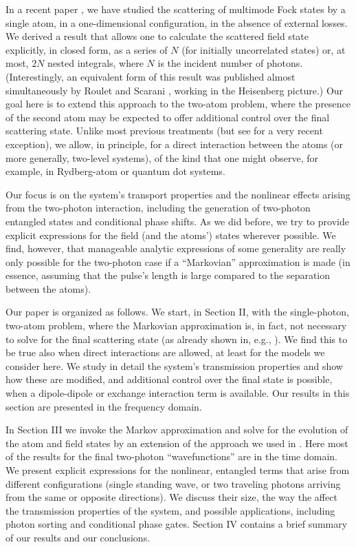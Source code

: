 \documentclass[aps,pra,twocolumn,floatfix,superscriptaddress]{revtex4}
\begin{document}
In a recent paper \cite{us}, we have studied the scattering of multimode Fock states by a single atom, in a one-dimensional configuration, in the absence of external losses. We derived a result that allows one to calculate the scattered field state explicitly, in closed form, as a series of $N$ (for initially uncorrelated states) or, at most, $2N$ nested integrals, where $N$ is the incident number of photons.  (Interestingly, an equivalent form of this result was published almost simultaneously by Roulet and Scarani \cite{roulet}, working in the Heisenberg picture.)  Our goal here is to extend this approach to the two-atom problem, where the presence of the second atom may be expected to offer additional control over the final scattering state. Unlike most previous treatments (but see \cite{interactions} for a very recent exception), we allow, in principle, for a direct interaction between the atoms (or more generally, two-level systems), of the kind that one might observe, for example, in Rydberg-atom or quantum dot systems. 

Our focus is on the system's transport properties and the nonlinear effects arising from the two-photon interaction, including the generation of two-photon entangled states and conditional phase shifts.  As we did before, we try to provide explicit expressions for the field (and the atoms') states wherever possible.  We find, however,  that manageable analytic expressions of some generality are really only possible for the two-photon case if a ``Markovian'' approximation is made (in essence, assuming that the pulse's length is large compared to the separation between the atoms).  

Our paper is organized as follows.  We start, in Section II, with the single-photon, two-atom problem, where the Markovian approximation is, in fact, not necessary to solve for the final scattering state (as already shown in, e.g., \cite{garciavidal1,zheng2,zubairy1}).  We find this to be true also when direct interactions are allowed, at least for the models we consider here.  We study in detail the system's transmission properties and show how these are modified, and additional control over the final state is possible, when a dipole-dipole or exchange interaction term is available. Our results in this section are presented in the frequency domain.

In Section III we invoke the Markov approximation and solve for the evolution of the atom and field states by an extension of the approach we used in \cite{us}.  Here most of the results for the final two-photon ``wavefunctions'' are in the time domain. We present explicit expressions for the nonlinear, entangled terms that arise from different configurations (single standing wave, or two traveling photons arriving from the same or opposite directions). We discuss their size, the way the affect the transmission properties of the system, and possible applications, including photon sorting and conditional phase gates.  Section IV contains a brief summary of our results and our conclusions.
\end{document}
